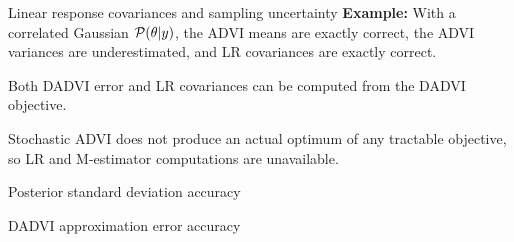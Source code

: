 \documentclass[8pt]{beamer}\usepackage[]{graphicx}\usepackage[]{color}
\begin{document}
\begin{frame}{Linear response covariances and sampling uncertainty}
\textbf{Example: } With a correlated Gaussian $\mathcal{P}(\theta \vert y)$,
the ADVI means are exactly correct, the ADVI variances are underestimated,
and LR covariances are exactly correct.

\pause

\hrulefill

Both DADVI error and LR covariances can be computed from the DADVI objective.

Stochastic ADVI does not produce an actual optimum of any tractable
objective, so LR and M-estimator computations are unavailable.

\end{frame}



\begin{frame}{Posterior standard deviation accuracy}
    \PosteriorSdAccuracy{}
\end{frame}


\begin{frame}{DADVI approximation error accuracy}
    \CoverageHistogram{}
\end{frame}


\end{document}

